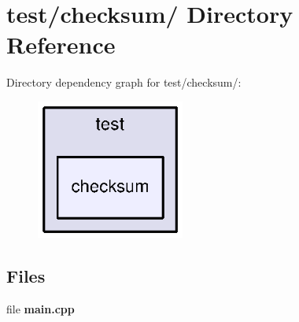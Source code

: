 \section{test/checksum/ Directory Reference}
\label{dir_e46c8d6064a83fd7846d88064aec1b42}
Directory dependency graph for test/checksum/:
\nopagebreak
\begin{figure}[H]
\begin{center}
\leavevmode
\includegraphics[width=138pt]{dir_e46c8d6064a83fd7846d88064aec1b42_dep}
\end{center}
\end{figure}
\subsection*{Files}
\begin{DoxyCompactItemize}
\item 
file {\bfseries main.cpp}
\end{DoxyCompactItemize}
